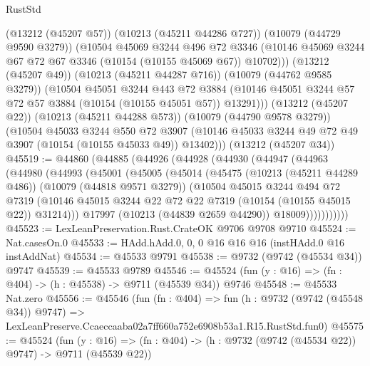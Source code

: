 \begin{lexlean}{RustStd}
\begin{coremodule}
          (@13212 (@45207 @57))
          (@10213 (@45211 @44286 @727))
          (@10079 (@44729 @9590 @3279))
          (@10504
            @45069
            @3244
            @496
            @72
            @3346
            (@10146 @45069 @3244 @67 @72 @67 @3346 (@10154 (@10155 @45069 @67)) @10702)))
        (@13212 (@45207 @49))
        (@10213 (@45211 @44287 @716))
        (@10079 (@44762 @9585 @3279))
        (@10504
          @45051
          @3244
          @443
          @72
          @3884
          (@10146 @45051 @3244 @57 @72 @57 @3884 (@10154 (@10155 @45051 @57)) @13291)))
      (@13212 (@45207 @22))
      (@10213 (@45211 @44288 @573))
      (@10079 (@44790 @9578 @3279))
      (@10504
        @45033
        @3244
        @550
        @72
        @3907
        (@10146 @45033 @3244 @49 @72 @49 @3907 (@10154 (@10155 @45033 @49)) @13402)))
    (@13212 (@45207 @34))
@45519 := @44860
    (@44885
      (@44926
        (@44928
          (@44930
            (@44947
              (@44963
                (@44980
                  (@44993
                    (@45001
                      (@45005
                        (@45014
                          (@45475
                            (@10213 (@45211 @44289 @486))
                            (@10079 (@44818 @9571 @3279))
                            (@10504
                              @45015
                              @3244
                              @494
                              @72
                              @7319
                              (@10146
                                @45015
                                @3244
                                @22
                                @72
                                @22
                                @7319
                                (@10154 (@10155 @45015 @22))
                                @31214)))
                          @17997
                          (@10213 (@44839 @2659 @44290))
                          @18009)))))))))))
@45523 := LexLeanPreservation.Rust.CrateOK @9706 @9708 @9710
@45524 := Nat.casesOn.{0}
@45533 := HAdd.hAdd.{0, 0, 0} @16 @16 @16 (instHAdd.{0} @16 instAddNat)
@45534 := @45533 @9791
@45538 := @9732 (@9742 (@45534 @34)) @9747
@45539 := @45533 @9789
@45546 := @45524 (fun (y : @16) => (fn : @404) -> (h : @45538) -> @9711 (@45539 @34)) @9746
@45548 := @45533 Nat.zero
@45556 := @45546
    (fun (fn : @404) =>
    fun (h : @9732 (@9742 (@45548 @34)) @9747) =>
    LexLeanPreserve.Ccaeccaaba02a7ff660a752e6908b53a1.R15.RustStd.fun0)
@45575 := @45524
    (fun (y : @16) => (fn : @404) -> (h : @9732 (@9742 (@45534 @22)) @9747) -> @9711 (@45539 @22))

\end{coremodule}
\end{lexlean}
